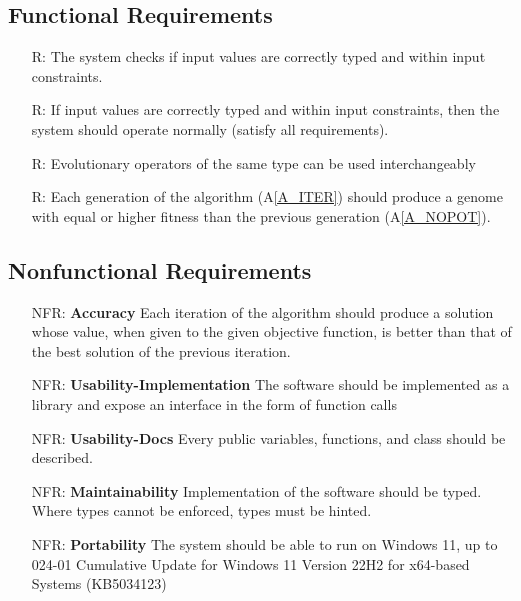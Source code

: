 \documentclass[12pt]{article}
\newcommand{\aref}[1]{A\ref{#1}}
\newcounter{reqnum} %
\newcounter{nfrnum} %
\begin{document}
\subsection{Functional Requirements}
\label{subsubsec:freq}
\noindent \begin{itemize}
\item[R\refstepcounter{reqnum}\thereqnum \label{R_TYPECHECK}:] The system checks if input values are correctly typed and within input constraints.
\item[R\refstepcounter{reqnum}\thereqnum \label{R_TYPETHEN}:] If input values are correctly typed and within input constraints, then the system should operate normally (satisfy all requirements).

\item[R\refstepcounter{reqnum}\thereqnum \label{R_EVOCHANGE}:] Evolutionary operators of the same type can be used interchangeably 

\item[R\refstepcounter{reqnum}\thereqnum \label{R_IMBETTER}:] Each generation of the algorithm (\aref{A_ITER}) should produce a genome with equal or higher fitness than the previous generation (\aref{A_NOPOT}).

\end{itemize}

\subsection{Nonfunctional Requirements}
\label{subsubsec:nfreq}


\noindent \begin{itemize}

\item[NFR\refstepcounter{nfrnum}\thenfrnum \label{NFR_Accuracy}:]
  \textbf{Accuracy} Each iteration of the algorithm should produce a solution whose value, when given to the given objective function, is better than that of the best solution of the previous iteration.

\item[NFR\refstepcounter{nfrnum}\thenfrnum \label{NFR_Usability-Impl}:] \textbf{Usability-Implementation}
  The software should be implemented as a library and expose an interface in the form of function calls

  \item[NFR\refstepcounter{nfrnum}\thenfrnum \label{NFR_Usability}:] \textbf{Usability-Docs}
  Every public variables, functions, and class should be described.

\item[NFR\refstepcounter{nfrnum}\thenfrnum \label{NFR_Maintainability}:]
  \textbf{Maintainability} 
  Implementation of the software should be typed. Where types cannot be enforced, types must be hinted.

\item[NFR\refstepcounter{nfrnum}\thenfrnum \label{NFR_Portability}:]
  \textbf{Portability} The system should be able to run on Windows 11, up to 024-01 Cumulative Update for Windows 11 Version 22H2 for x64-based Systems (KB5034123)
  

\end{itemize}
\end{document}
